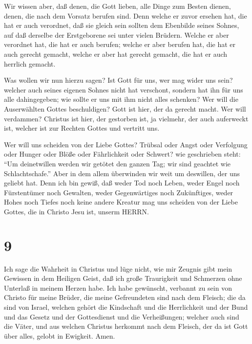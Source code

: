  Wir wissen aber, daß denen, die Gott lieben, alle Dinge
zum Besten dienen, denen, die nach dem Vorsatz berufen sind.
 Denn welche er zuvor ersehen hat, die hat er auch
verordnet, daß sie gleich sein sollten dem Ebenbilde seines Sohnes, auf
daß derselbe der Erstgeborene sei unter vielen Brüdern. 
Welche er aber verordnet hat, die hat er auch berufen; welche er aber
berufen hat, die hat er auch gerecht gemacht, welche er aber hat gerecht
gemacht, die hat er auch herrlich gemacht.

 Was wollen wir nun hierzu sagen? Ist Gott für uns, wer mag
wider uns sein?  welcher auch seines eigenen Sohnes nicht
hat verschont, sondern hat ihn für uns alle dahingegeben; wie sollte er
uns mit ihm nicht alles schenken?  Wer will die
Auserwählten Gottes beschuldigen? Gott ist hier, der da gerecht macht.
 Wer will verdammen? Christus ist hier, der gestorben ist,
ja vielmehr, der auch auferweckt ist, welcher ist zur Rechten Gottes und
vertritt uns.

 Wer will uns scheiden von der Liebe Gottes? Trübsal oder
Angst oder Verfolgung oder Hunger oder Blöße oder Fährlichkeit oder
Schwert?  wie geschrieben steht: ``Um deinetwillen werden
wir getötet den ganzen Tag; wir sind geachtet wie Schlachtschafe.''
 Aber in dem allem überwinden wir weit um deswillen, der
uns geliebt hat.  Denn ich bin gewiß, daß weder Tod noch
Leben, weder Engel noch Fürstentümer noch Gewalten, weder Gegenwärtiges
noch Zukünftiges,  weder Hohes noch Tiefes noch keine
andere Kreatur mag uns scheiden von der Liebe Gottes, die in Christo
Jesu ist, unserm HERRN.

\hypertarget{section-8}{%
\section{9}\label{section-8}}

 Ich sage die Wahrheit in Christus und lüge nicht, wie mir
Zeugnis gibt mein Gewissen in dem Heiligen Geist,  daß ich
große Traurigkeit und Schmerzen ohne Unterlaß in meinem Herzen habe.
 Ich habe gewünscht, verbannt zu sein von Christo für meine
Brüder, die meine Gefreundeten sind nach dem Fleisch;  die
da sind von Israel, welchen gehört die Kindschaft und die Herrlichkeit
und der Bund und das Gesetz und der Gottesdienst und die Verheißungen;
 welcher auch sind die Väter, und aus welchen Christus
herkommt nach dem Fleisch, der da ist Gott über alles, gelobt in
Ewigkeit. Amen.

